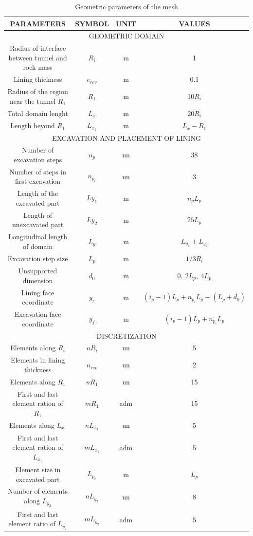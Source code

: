 \documentclass[Journal,letterpaper]{ascelike-new}
\begin{document}
\begin{table}
	\caption{Geometric parameters of the mesh}
	\label{parametros_AXI}
	\centering
	\small
	\renewcommand{\arraystretch}{1.25}
	\begin{tabular}{c c c c}
		\hline
		\multicolumn{1}{c}{\textbf{PARAMETERS}} &
		\multicolumn{1}{c}{\textbf{SYMBOL}} &
		\multicolumn{1}{c}{\textbf{UNIT}} &
		\multicolumn{1}{c}{\textbf{VALUES}} \\
		\hline
		\multicolumn{4}{c}{GEOMETRIC DOMAIN} \\
		\hline
		Radius of interface between tunnel and rock mass & $R_i$ & m & 1 \\		
		Lining thickness & $e_{rev}$ & m & 0.1 \\
		Radius of the region near the tunnel $R_1$ & $R_1$ & m & 10$R_{i}$ \\
		Total domain lenght & $L_{x}$ & m & $20R_i$ \\		
		Length beyond $R_1$ & $L_{x_1}$ & m & $L_x - R_1$ \\							
		\hline
		\multicolumn{4}{c}{EXCAVATION AND PLACEMENT OF LINING} \\
		\hline
		Number of excavation steps & $n_p$ & un & 38 \\
		Number of steps in first excavation & $n_{p_i}$ & un & 3 \\
		Length of the excavated part & $Ly_{1}$ & m & $n_pL_p$ \\
		Length of unexcavated part & $Ly_{2}$ & m & $25L_p$ \\
		Longitudinal length of domain & $L_y$ & m & $L_{y_1}+L_{y_2}$ \\
		Excavation step size & $L_{p}$ & m & $1/3R_{i}$ \\
		Unsupported dimension & $d_0$ & m & $0,~2L_{p},~4L_{p}$ \\
		Lining face coordinate & $y_r$ & m & $(i_p-1)L_p + n_{p_i}L_p - (L_p+d_0)$ \\
		Excavation face coordinate & $y_f$ & m & $(i_p-1)L_p + n_{p_i}L_p$ \\
		\hline
		\multicolumn{4}{c}{DISCRETIZATION} \\
		\hline
		Elements along $R_i$ & $nR_{i}$ & un & 5 \\	
		Elements in lining thickness & $n_{rev}$ & un & 2 \\			
		Elements along $R_1$ & $nR_{1}$ & un & 15 \\	
		First and last element ration of $R_1$ & $mR_{1}$ & adm & 15 \\	
		Elements along $L_{x_1}$ & $nL_{x_1}$ & un & 5 \\
		First and last element ration of $L_{x_1}$ & $mL_{x_1}$ & adm & 5 \\				
		Element size in excavated part & $L_{p_e}$ & m & $L_{p}$ \\	
		Number of elements along $L_{y_2}$ & $nL_{y_2}$ & un & 8 \\			
		First and last element ratio of $L_{y_2}$ & $mL_{y_2}$ & adm & 5 \\				
		\hline
	\end{tabular}
	\normalsize
\end{table}
\end{document}
